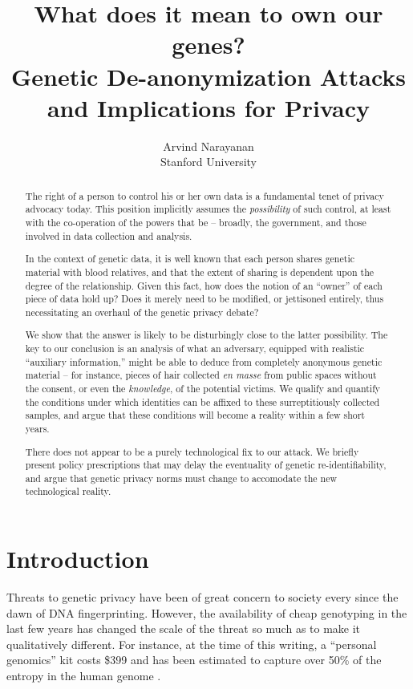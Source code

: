 \documentclass{article}
\title{What does it mean to own our genes?\\
{\small Genetic De-anonymization Attacks and Implications for Privacy}}
\author{Arvind Narayanan \\
{\small Stanford University}}
\begin{document}
\maketitle




\begin{abstract}
The right of a person to control his or her own data is a fundamental tenet of privacy advocacy today. This position implicitly assumes the {\em possibility} of such control, at least with the co-operation of the powers that be -- broadly, the government, and those involved in data collection and analysis.

In the context of genetic data, it is well known that each person shares genetic material with blood relatives, and that the extent of sharing is dependent upon the degree of the relationship. Given this fact, how does the notion of an ``owner'' of each piece of data hold up? Does it merely need to be modified, or jettisoned entirely, thus necessitating an overhaul of the genetic privacy debate?

We show that the answer is likely to be disturbingly close to the latter possibility. The key to our conclusion is an analysis of what an adversary, equipped with realistic ``auxiliary information,'' might be able to deduce from completely anonymous genetic material -- for instance, pieces of hair collected {\em en masse} from public spaces without the consent, or even the {\em knowledge}, of the potential victims. We qualify and quantify the conditions under which identities can be affixed to these surreptitiously collected samples, and argue that these conditions will become a reality within a few short years.

There does not appear to be a purely technological fix to our attack. We briefly present policy prescriptions that may delay the eventuality of genetic re-identifiability, and argue that genetic privacy norms must change to accomodate the new technological reality.
\end{abstract}

\section{Introduction}

Threats to genetic privacy have been of great concern to society every since the dawn of DNA fingerprinting. However, the availability of cheap genotyping in the last few years has changed the scale of the threat so much as to make it qualitatively different. For instance, at the time of this writing, a ``personal genomics'' kit costs \$399 \cite{23-and-me} and has been estimated to capture over 50\% of the entropy in the human genome \cite{snpentropy}.
\end{document}
